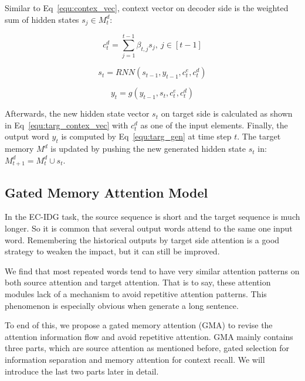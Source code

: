 \documentclass[letterpaper]{article} %
\begin{document}
Similar to Eq~\eqref{equ:contex_vec}, context vector on decoder side is the weighted sum of hidden states $s_j \in M_{t}^d$: 

\begin{equation}
\label{equ:targ_contex_vec}
c_t^d=\sum_{j=1}^{t-1} \beta_{t,j} s_j, \ j \in[t-1]
\end{equation}

\begin{equation}
\label{equ:targ_contex_vec}
s_t=RNN(s_{t-1},y_{t-1},c_t^e,c_t^d) 
\end{equation}

\begin{equation}
\label{equ:targ_gen}
y_t=g(y_{t-1},s_{t},c_t^e,c_t^d) 
\end{equation}

Afterwards, the new hidden state vector $s_t$ on target side is calculated as shown in Eq~\eqref{equ:targ_contex_vec} with $ c_t^d$ as one of the input elements. 
Finally, the output word $y_t$ is computed by Eq~\eqref{equ:targ_gen} at time step $t$. 
The target memory $M^{d}$ is updated by pushing the new generated hidden state $s_t$ in: $M^{d}_{t+1} = M_{t}^d \cup {s_t}$. 

\subsection{Gated Memory Attention Model}

In the EC-IDG task, the source sequence is short and the target sequence is much longer. So it is common that several output words attend to the same one input word. Remembering the historical outputs by target side attention is a good strategy to weaken the impact, but it can still be improved.

We find that most repeated words tend to have very similar attention patterns on both source attention and target attention. That is to say, these attention modules lack of a mechanism to avoid repetitive attention patterns. This phenomenon is especially obvious when generate a long sentence.

To end of this, we propose a gated memory attention (GMA) to revise the attention information flow and avoid repetitive attention. 
GMA mainly contains three parts, which are source attention as mentioned before, gated selection for information separation and memory attention for context recall. We will introduce the last two parts later in detail. 
\end{document}
